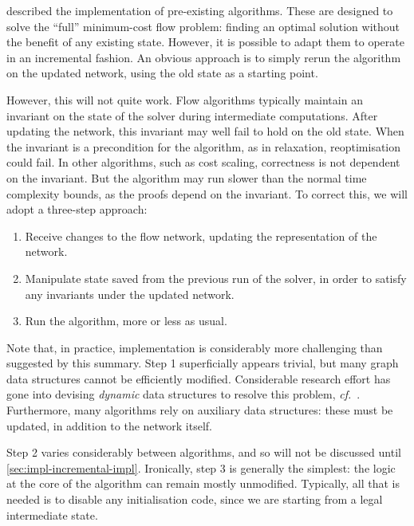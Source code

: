  described the implementation of pre-existing algorithms. These are designed to solve the ``full'' minimum-cost flow problem: finding an optimal solution without the benefit of any existing state. However, it is possible to adapt them to operate in an incremental fashion. An obvious approach is to simply rerun the algorithm on the updated network, using the old state as a starting point.

However, this will not quite work. Flow algorithms typically maintain an invariant on the state of the solver during intermediate computations. After updating the network, this invariant may well fail to hold on the old state. When the invariant is a precondition for the algorithm, as in relaxation, reoptimisation could fail. In other algorithms, such as cost scaling, correctness is not dependent on the invariant. But the algorithm may run slower than the normal time complexity bounds, as the proofs depend on the invariant. To correct this, we will adopt a three-step approach:

\begin{enumerate}
    \item Receive changes to the flow network, updating the representation of the network.
    \item Manipulate state saved from the previous run of the solver, in order to satisfy any invariants under the updated network.
    \item Run the algorithm, more or less as usual.
\end{enumerate}

Note that, in practice, implementation is considerably more challenging than suggested by this summary. Step 1 superficially appears trivial, but many graph data structures cannot be efficiently modified. Considerable research effort has gone into devising \emph{dynamic} data structures to resolve this problem, \textit{cf.\@}~\cite{Tarjan:1983,Eppstein:1996}. Furthermore, many algorithms rely on auxiliary data structures\footnotemark: these must be updated, in addition to the network itself.

Step 2 varies considerably between algorithms, and so will not be discussed until \cref{sec:impl-incremental-impl}. Ironically, step 3 is generally the simplest: the logic at the core of the algorithm can remain mostly unmodified. Typically, all that is needed is to disable any initialisation code, since we are starting from a legal intermediate state.

